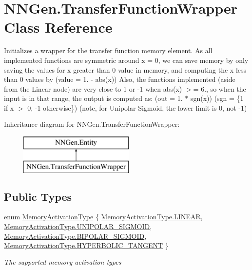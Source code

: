 \hypertarget{class_n_n_gen_1_1_transfer_function_wrapper}{}\section{N\+N\+Gen.\+Transfer\+Function\+Wrapper Class Reference}
\label{class_n_n_gen_1_1_transfer_function_wrapper}


Initializes a wrapper for the transfer function memory element. As all implemented functions are symmetric around x = 0, we can save memory by only saving the values for x greater than 0 value in memory, and computing the x less than 0 values by (value = 1. -\/ abs(x)) Also, the functions implemented (aside from the Linear node) are very close to 1 or -\/1 when abs(x) $>$= 6., so when the input is in that range, the output is computed as\+: (out = 1. $\ast$ sgn(x)) (sgn = \{1 if x $>$ 0, -\/1 otherwise\}) (note, for Unipolar Sigmoid, the lower limit is 0, not -\/1)  


Inheritance diagram for N\+N\+Gen.\+Transfer\+Function\+Wrapper\+:\begin{figure}[H]
\begin{center}
\leavevmode
\includegraphics[height=2.000000cm]{class_n_n_gen_1_1_transfer_function_wrapper}
\end{center}
\end{figure}
\subsection*{Public Types}
\begin{DoxyCompactItemize}
\item 
enum \hyperlink{class_n_n_gen_1_1_transfer_function_wrapper_aa338ffadb8fcdf76df75419374a51ff6}{Memory\+Activation\+Type} \{ \hyperlink{class_n_n_gen_1_1_transfer_function_wrapper_aa338ffadb8fcdf76df75419374a51ff6aaac544aacc3615aada24897a215f5046}{Memory\+Activation\+Type.\+L\+I\+N\+E\+A\+R}, 
\hyperlink{class_n_n_gen_1_1_transfer_function_wrapper_aa338ffadb8fcdf76df75419374a51ff6a40a595040be78efa1c583f123663f8a8}{Memory\+Activation\+Type.\+U\+N\+I\+P\+O\+L\+A\+R\+\_\+\+S\+I\+G\+M\+O\+I\+D}, 
\hyperlink{class_n_n_gen_1_1_transfer_function_wrapper_aa338ffadb8fcdf76df75419374a51ff6ad465b2bacf5410a807fab76338ad95bd}{Memory\+Activation\+Type.\+B\+I\+P\+O\+L\+A\+R\+\_\+\+S\+I\+G\+M\+O\+I\+D}, 
\hyperlink{class_n_n_gen_1_1_transfer_function_wrapper_aa338ffadb8fcdf76df75419374a51ff6a1b8b4b9feedd482b4faaaa5ba9851770}{Memory\+Activation\+Type.\+H\+Y\+P\+E\+R\+B\+O\+L\+I\+C\+\_\+\+T\+A\+N\+G\+E\+N\+T}
 \}\begin{DoxyCompactList}\small\item\em The supported memory activation types \end{DoxyCompactList}
\end{DoxyCompactItemize}
